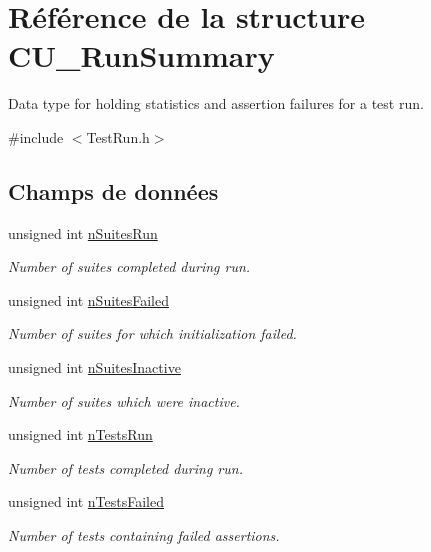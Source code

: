 \hypertarget{structCU__RunSummary}{\section{Référence de la structure C\-U\-\_\-\-Run\-Summary}
\label{structCU__RunSummary}
}


Data type for holding statistics and assertion failures for a test run.  




{\ttfamily \#include $<$Test\-Run.\-h$>$}

\subsection*{Champs de données}
\begin{DoxyCompactItemize}
\item 
unsigned int \hyperlink{structCU__RunSummary_ae426617945d15652562f4d2b5d243f51}{n\-Suites\-Run}
\begin{DoxyCompactList}\small\item\em Number of suites completed during run. \end{DoxyCompactList}\item 
unsigned int \hyperlink{structCU__RunSummary_a7ef012ea5105cd86ff16bf131f1d0ac2}{n\-Suites\-Failed}
\begin{DoxyCompactList}\small\item\em Number of suites for which initialization failed. \end{DoxyCompactList}\item 
unsigned int \hyperlink{structCU__RunSummary_a08b166bdf14cc18cbfa77a47fb911904}{n\-Suites\-Inactive}
\begin{DoxyCompactList}\small\item\em Number of suites which were inactive. \end{DoxyCompactList}\item 
unsigned int \hyperlink{structCU__RunSummary_a15da425a520dfb2628febc5313c92aa7}{n\-Tests\-Run}
\begin{DoxyCompactList}\small\item\em Number of tests completed during run. \end{DoxyCompactList}\item 
unsigned int \hyperlink{structCU__RunSummary_a3a3be4dfb55ceffdb2ffacdac9796d24}{n\-Tests\-Failed}
\begin{DoxyCompactList}\small\item\em Number of tests containing failed assertions. \end{DoxyCompactList}\item 

\end{DoxyCompactItemize}
